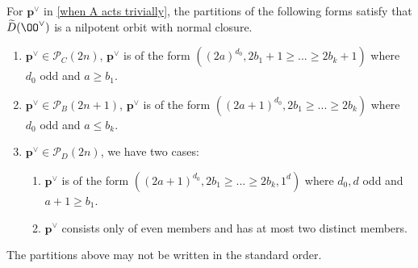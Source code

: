 \documentclass[12pt]{amsart}
\begin{document}
\begin{lemma} \label{best condition}
    For $\mathbf{p}^\vee$ in \cref{when A acts trivially}, the partitions of the following forms satisfy that $\widetilde{D}(\OO^\vee)$ is a nilpotent orbit with normal closure. 
    \begin{enumerate}
        \item $\mathbf{p}^\vee \in \mathcal{P}_{C}(2n)$, $\mathbf{p}^\vee$ is of the form $((2a)^{d_0}, 2b_1+1\geqslant...\geqslant 2b_k+1)$ where $d_0$ odd and $a\geqslant b_1$.
        \item $\mathbf{p}^\vee\in \mathcal{P}_{B}(2n+1)$, $\mathbf{p}^\vee$ is of the form $((2a+1)^{d_0}, 2b_1\geqslant ... \geqslant 2b_k)$ where $d_0$ odd and $a\leqslant b_k$.
        \item $\mathbf{p}^\vee\in \mathcal{P}_{D}(2n)$, we have two cases:
        \begin{enumerate}
            \item $\mathbf{p}^\vee$ is of the form $((2a+1)^{d_0}, 2b_1\geqslant...\geqslant 2b_k, 1^{d})$ where $d_0, d$ odd and $a+1 \geqslant b_1$.
            \item $\mathbf{p}^\vee$ consists only of even members and has at most two distinct members.
        \end{enumerate}        
    \end{enumerate}
    The partitions above may not be written in the standard order.
\end{lemma}
\end{document}
